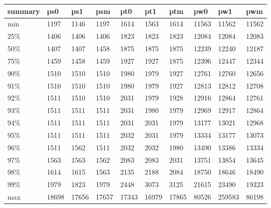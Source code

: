 \begin{tabular}{llllllllll}
\toprule
summary &    ps0 &    ps1 &    psm &    pt0 &    pt1 &    ptm &    pw0 &     pw1 &    pwm \\
\midrule
    min &   1197 &   1146 &   1197 &   1614 &   1563 &   1614 &  11563 &   11562 &  11562 \\
    25\% &   1406 &   1406 &   1406 &   1823 &   1823 &   1823 &  12084 &   12084 &  12083 \\
    50\% &   1407 &   1407 &   1458 &   1875 &   1875 &   1875 &  12239 &   12240 &  12187 \\
    75\% &   1459 &   1458 &   1459 &   1927 &   1927 &   1875 &  12396 &   12447 &  12344 \\
    90\% &   1510 &   1510 &   1510 &   1980 &   1979 &   1927 &  12761 &   12760 &  12656 \\
    91\% &   1510 &   1510 &   1510 &   1980 &   1979 &   1927 &  12813 &   12812 &  12708 \\
    92\% &   1511 &   1510 &   1510 &   2031 &   1979 &   1928 &  12916 &   12864 &  12761 \\
    93\% &   1511 &   1511 &   1511 &   2031 &   1980 &   1979 &  12969 &   12917 &  12864 \\
    94\% &   1511 &   1511 &   1511 &   2031 &   2031 &   1979 &  13177 &   13021 &  12968 \\
    95\% &   1511 &   1511 &   1511 &   2032 &   2031 &   1979 &  13334 &   13177 &  13073 \\
    96\% &   1511 &   1562 &   1511 &   2032 &   2032 &   1980 &  13490 &   13386 &  13334 \\
    97\% &   1563 &   1563 &   1562 &   2083 &   2083 &   2031 &  13751 &   13854 &  13645 \\
    98\% &   1614 &   1615 &   1563 &   2135 &   2188 &   2084 &  18750 &   18646 &  18490 \\
    99\% &   1979 &   1823 &   1979 &   2448 &   3073 &   3125 &  21615 &   23490 &  19323 \\
    max &  18698 &  17656 &  17657 &  17343 &  16979 &  17865 &  80526 &  259583 &  86198 \\
\bottomrule
\end{tabular}
